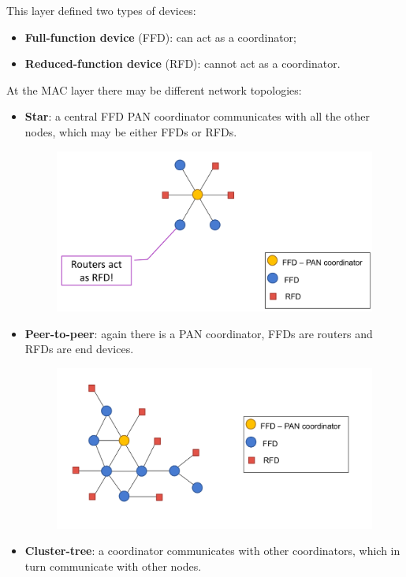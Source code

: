This layer defined two types of devices:
\begin{itemize}
   \item \textbf{Full-function device} (FFD): can act as a coordinator;
   \item \textbf{Reduced-function device} (RFD): cannot act as a coordinator.
\end{itemize}


At the MAC layer there may be different network topologies:
\begin{itemize}
   \item \textbf{Star}: a central FFD PAN coordinator communicates with all the other nodes, which may be either FFDs or RFDs.
   \begin{figure}[htbp]
      \centering
      \includegraphics{images/802_star.png}
      \label{fig:802_star}
   \end{figure}
   \item \textbf{Peer-to-peer}: again there is a PAN coordinator, FFDs are routers and RFDs are end devices.
   \begin{figure}[htbp]
      \centering
      \includegraphics{images/802_p2p.png}
      \label{fig:802_p2p}
   \end{figure}
   \item \textbf{Cluster-tree}: a coordinator communicates with other coordinators, which in turn communicate with other nodes.
\end{itemize}
   
